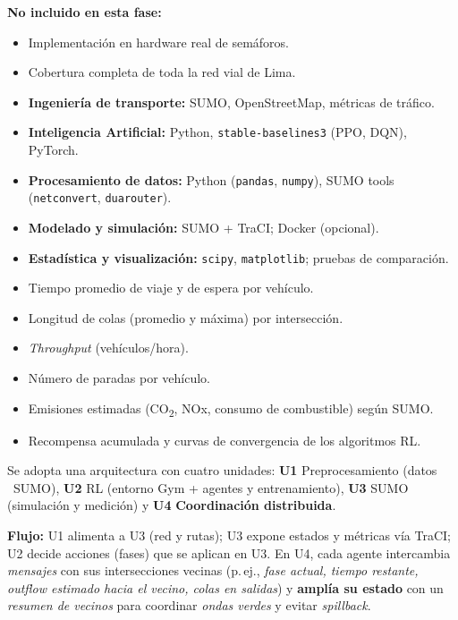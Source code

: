 \textbf{No incluido en esta fase:}
\begin{itemize}
    \item Implementación en hardware real de semáforos.
    \item Cobertura completa de toda la red vial de Lima.
\end{itemize}


\begin{itemize}
    \item \textbf{Ingeniería de transporte:} SUMO, OpenStreetMap, métricas de tráfico.
    \item \textbf{Inteligencia Artificial:} Python, \texttt{stable-baselines3} (PPO, DQN), PyTorch.
    \item \textbf{Procesamiento de datos:} Python (\texttt{pandas}, \texttt{numpy}), SUMO tools (\texttt{netconvert}, \texttt{duarouter}).
    \item \textbf{Modelado y simulación:} SUMO + TraCI; Docker (opcional).
    \item \textbf{Estadística y visualización:} \texttt{scipy}, \texttt{matplotlib}; pruebas de comparación.
\end{itemize}


\begin{itemize}
    \item Tiempo promedio de viaje y de espera por vehículo.
    \item Longitud de colas (promedio y máxima) por intersección.
    \item \textit{Throughput} (vehículos/hora).
    \item Número de paradas por vehículo.
    \item Emisiones estimadas (CO\textsubscript{2}, NOx, consumo de combustible) según SUMO.
    \item Recompensa acumulada y curvas de convergencia de los algoritmos RL.
\end{itemize}


Se adopta una arquitectura con cuatro unidades: 
\textbf{U1} Preprocesamiento (datos \textrightarrow\ SUMO), 
\textbf{U2} RL (entorno Gym + agentes y entrenamiento), 
\textbf{U3} SUMO (simulación y medición) y 
\textbf{U4} \textbf{Coordinación distribuida}.

\textbf{Flujo:} U1 alimenta a U3 (red y rutas); U3 expone estados y métricas vía TraCI; U2 decide acciones (fases) que se aplican en U3. En U4, cada agente intercambia \textit{mensajes} con sus intersecciones vecinas (p.\,ej., \emph{fase actual, tiempo restante, outflow estimado hacia el vecino, colas en salidas}) y \textbf{amplía su estado} con un \emph{resumen de vecinos} para coordinar \textit{ondas verdes} y evitar \textit{spillback}.


